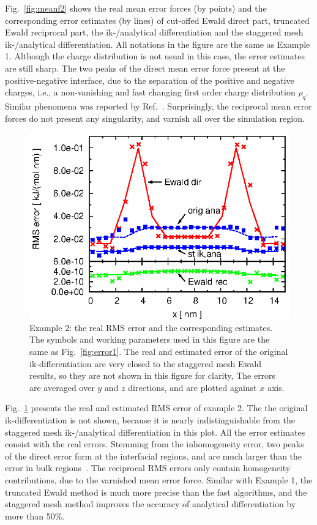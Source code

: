 \documentclass[aps,pre,preprint]{revtex4}
\begin{document}
Fig.~\ref{fig:meanf2} shows the real mean error forces (by points) and the
corresponding error estimates (by lines) of cut-offed Ewald direct
part, truncated Ewald reciprocal part, the ik-/analytical
differentiation 
and the staggered mesh ik-/analytical differentiation. All
notations in the figure are the same as Example 1.  Although the
charge distribution is not usual in this case, the error estimates are still
sharp. The two peaks of the direct mean  error force present at the
positive-negative interface, due to the separation of the positive
and negative charges, i.e., a non-vanishing and fast changing first order charge
distribution $\rho_q$.  Similar phenomena was reported by
Ref.~\cite{wang2012}. Surprisingly, 
the reciprocal mean error forces
do not present any singularity, and varnish
all over the simulation region.

\begin{figure}
  \centering
  \includegraphics[]{fig.new/fig.rand2.error.eps}
  \caption{
    Example 2: the real RMS error and the corresponding
    estimates.
    The symbols and working parameters used in this figure are the same as
    Fig.~\ref{fig:error1}.
    The real and estimated error of the original ik-differentiation
    are very closed to the staggered mesh Ewald results, so
    they are not shown in this figure for clarity, 
    The errors are averaged over $y$ and $z$ directions, and are
    plotted against $x$ axis.
  }
  \label{fig:error2}
\end{figure}

Fig.~\ref{fig:error2} presents the real and estimated
RMS error of example 2. The
the original ik-differentiation is not
shown, because it is nearly indistinguishable from the staggered
mesh ik-/analytical differentiation in this plot.
All the error estimates consist with the real errors.
Stemming from the inhomogeneity error,
two peaks of the direct error form at the interfacial
regions, and are much larger than the error in bulk
regions~\cite{wang2012}.
The reciprocal RMS errors only contain homogeneity contributions,
due to the varnished mean error force.
Similar with Example 1, the truncated Ewald
method is much more precise than the fast algorithms, and the
staggered mesh method improves the accuracy of analytical
differentiation by more than 50\%.
\end{document}

